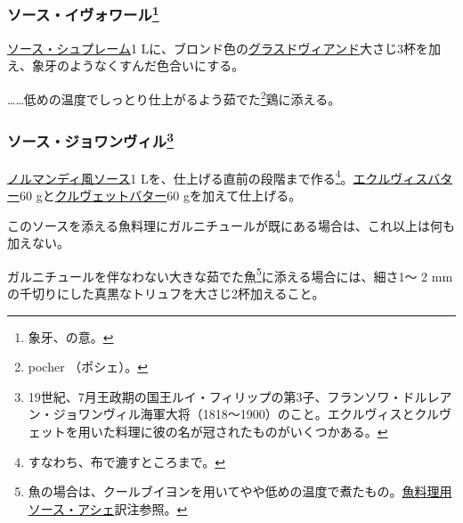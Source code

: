 \begin{recette}
\atoaki{}

\hypertarget{sauce-ivoire}{%
\subsubsection[ソース・イヴォワール]{\texorpdfstring{ソース・イヴォワール\footnote{象牙、の意。}}{ソース・イヴォワール}}\label{sauce-ivoire}}


 

\protect\hyperlink{sauce-supreme}{ソース・シュプレーム}1
Lに、ブロンド色の\protect\hyperlink{glace-de-viande}{グラスドヴィアンド}大さじ3杯を加え、象牙のようなくすんだ色合いにする。

\ldots{}\ldots{}低めの温度でしっとり仕上がるよう茹でた\footnote{pocher
  （ポシェ）。}鶏に添える。

\atoaki{}

\hypertarget{sauce-joinville}{%
\subsubsection[ソース・ジョワンヴィル]{\texorpdfstring{ソース・ジョワンヴィル\footnote{19世紀、7月王政期の国王ルイ・フィリップの第3子、フランソワ・ドルレアン・ジョワンヴィル海軍大将（1818〜1900）のこと。エクルヴィスとクルヴェットを用いた料理に彼の名が冠されたものがいくつかある。}}{ソース・ジョワンヴィル}}\label{sauce-joinville}}



\protect\hyperlink{sauce-normande}{ノルマンディ風ソース}1
Lを、仕上げる直前の段階まで作る\footnote{すなわち、布で漉すところまで。}。\protect\hyperlink{beurre-d-ecrevisse}{エクルヴィスバター}60
gと\protect\hyperlink{}{クルヴェットバター}60 gを加えて仕上げる。

このソースを添える魚料理にガルニチュールが既にある場合は、これ以上は何も加えない。

ガルニチュールを伴なわない大きな茹でた魚\footnote{魚の場合は、クールブイヨンを用いてやや低めの温度で煮たもの。\protect\hyperlink{sauce-hachee-maigre}{魚料理用ソース・アシェ}訳注参照。}に添える場合には、細さ1〜
2 mmの千切りにした真黒なトリュフを大さじ2杯加えること。


\end{recette}
